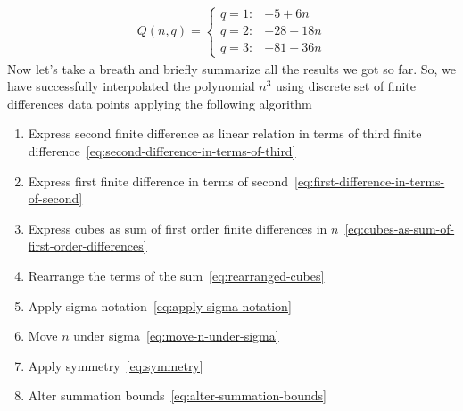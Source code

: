 \begin{align*}
    Q(n, q) =
    \begin{cases}
        q = 1: & -5 + 6 n \\
        q = 2: & -28 + 18 n \\
        q = 3: & -81 + 36 n
    \end{cases}
\end{align*}
Now let's take a breath and briefly summarize all the results we got so far.
So, we have successfully interpolated the polynomial $n^3$ using discrete set of finite differences data points
applying the following algorithm
\begin{enumerate}
    \item Express second finite difference as linear relation in terms of third
    finite difference~\eqref{eq:second-difference-in-terms-of-third}
    \item Express first finite difference in terms of second~\eqref{eq:first-difference-in-terms-of-second}
    \item Express cubes as sum of first order finite differences in $n$~\eqref{eq:cubes-as-sum-of-first-order-differences}
    \item Rearrange the terms of the sum~\eqref{eq:rearranged-cubes}
    \item Apply sigma notation~\eqref{eq:apply-sigma-notation}
    \item Move $n$ under sigma~\eqref{eq:move-n-under-sigma}
    \item Apply symmetry~\eqref{eq:symmetry}
    \item Alter summation bounds~\eqref{eq:alter-summation-bounds}
\end{enumerate}
\label{itm:cubes-algorithm}


